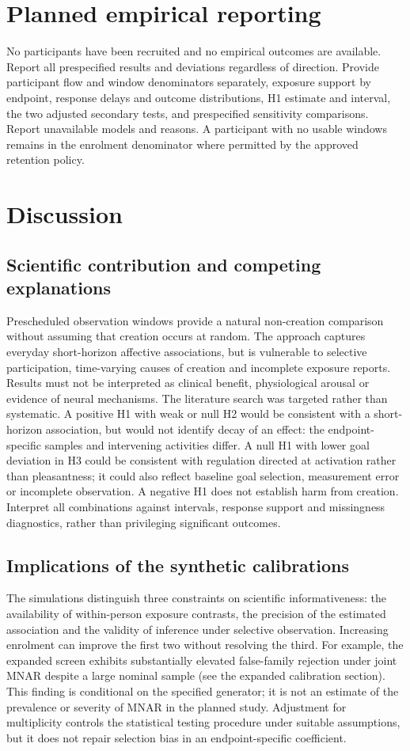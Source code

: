 \documentclass[11pt]{article}
\begin{document}
\section{Planned empirical reporting}
No participants have been recruited and no empirical outcomes are available. Report all prespecified results and deviations regardless of direction. Provide participant flow and window denominators separately, exposure support by endpoint, response delays and outcome distributions, H1 estimate and interval, the two adjusted secondary tests, and prespecified sensitivity comparisons. Report unavailable models and reasons. A participant with no usable windows remains in the enrolment denominator where permitted by the approved retention policy.
\section{Discussion}
\subsection{Scientific contribution and competing explanations}
Prescheduled observation windows provide a natural non-creation comparison without assuming that creation occurs at random. The approach captures everyday short-horizon affective associations, but is vulnerable to selective participation, time-varying causes of creation and incomplete exposure reports. Results must not be interpreted as clinical benefit, physiological arousal or evidence of neural mechanisms. The literature search was targeted rather than systematic. A positive H1 with weak or null H2 would be consistent with a short-horizon association, but would not identify decay of an effect: the endpoint-specific samples and intervening activities differ. A null H1 with lower goal deviation in H3 could be consistent with regulation directed at activation rather than pleasantness; it could also reflect baseline goal selection, measurement error or incomplete observation. A negative H1 does not establish harm from creation. Interpret all combinations against intervals, response support and missingness diagnostics, rather than privileging significant outcomes.

\subsection{Implications of the synthetic calibrations}
The simulations distinguish three constraints on scientific informativeness: the availability of within-person exposure contrasts, the precision of the estimated association and the validity of inference under selective observation. Increasing enrolment can improve the first two without resolving the third. For example, the expanded screen exhibits substantially elevated false-family rejection under joint MNAR despite a large nominal sample (see the expanded calibration section). This finding is conditional on the specified generator; it is not an estimate of the prevalence or severity of MNAR in the planned study. Adjustment for multiplicity controls the statistical testing procedure under suitable assumptions, but it does not repair selection bias in an endpoint-specific coefficient.
\end{document}

